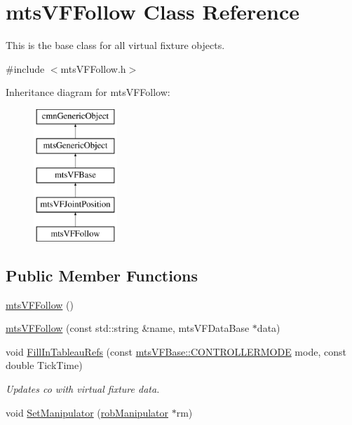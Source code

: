 \hypertarget{classmts_v_f_follow}{}\section{mts\+V\+F\+Follow Class Reference}
\label{classmts_v_f_follow}


This is the base class for all virtual fixture objects.  




{\ttfamily \#include $<$mts\+V\+F\+Follow.\+h$>$}

Inheritance diagram for mts\+V\+F\+Follow\+:\begin{figure}[H]
\begin{center}
\leavevmode
\includegraphics[height=5.000000cm]{df/dfa/classmts_v_f_follow}
\end{center}
\end{figure}
\subsection*{Public Member Functions}
\begin{DoxyCompactItemize}
\item 
\hyperlink{classmts_v_f_follow_a5f15e27b89b3d7f72ae070521e6a9eb6}{mts\+V\+F\+Follow} ()
\item 
\hyperlink{classmts_v_f_follow_a0d0f799ae68cefa06cdd18dc5b1238ce}{mts\+V\+F\+Follow} (const std\+::string \&name, mts\+V\+F\+Data\+Base $\ast$data)
\item 
void \hyperlink{classmts_v_f_follow_a2fe8bc0fb58b00efe62b4d145e561989}{Fill\+In\+Tableau\+Refs} (const \hyperlink{classmts_v_f_base_a742dd08f8b70bafeb746cec14d9ee974}{mts\+V\+F\+Base\+::\+C\+O\+N\+T\+R\+O\+L\+L\+E\+R\+M\+O\+D\+E} mode, const double Tick\+Time)
\begin{DoxyCompactList}\small\item\em Updates co with virtual fixture data. \end{DoxyCompactList}\item 
void \hyperlink{classmts_v_f_follow_aadec8c04389a7cf95447d843870b762a}{Set\+Manipulator} (\hyperlink{classrob_manipulator}{rob\+Manipulator} $\ast$rm)
\end{DoxyCompactItemize}
